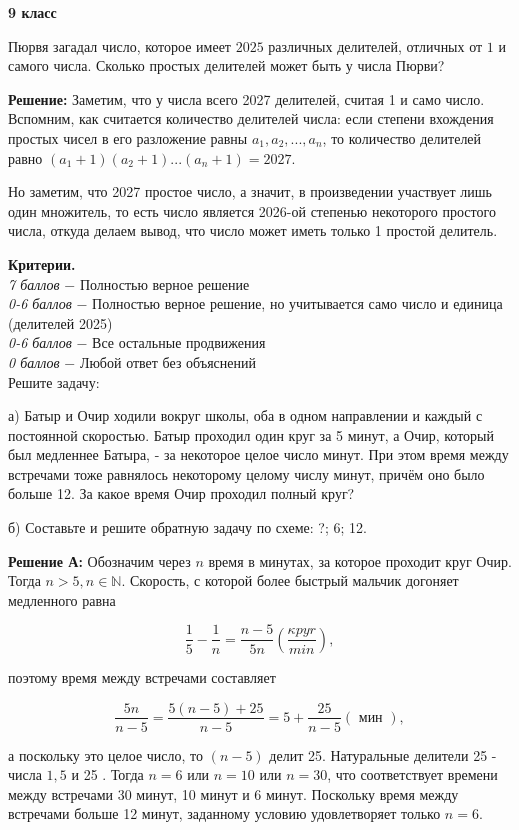 \centerline{\bf \Large  9 класс}

Пюрвя загадал число, которое имеет $2025$ различных делителей, отличных от $1$ и самого числа. Сколько простых делителей может быть у числа Пюрви?

\textbf{Решение:} Заметим, что у числа всего 2027 делителей, считая 1 и само число. Вспомним, как считается количество делителей числа:
если степени вхождения простых чисел в его разложение равны $a_1, a_2, ..., a_n$, то количество делителей равно
$(a_1+1)(a_2+1)...(a_n+1)=2027$.

Но заметим, что 2027 простое число, а значит, в произведении участвует лишь один множитель, то есть число является 2026-ой степенью некоторого простого числа, откуда делаем вывод, что число может иметь только 1 простой делитель.


\textbf{Критерии.} \\
\textit{7 баллов} $-$ Полностью верное решение\\
\textit{0-6 баллов} $-$ Полностью верное решение, но учитывается само число и единица (делителей 2025)\\
\textit{0-6 баллов} $-$ Все остальные продвижения\\
\textit{0 баллов} $-$ Любой ответ без объяснений\\


 Решите задачу:

а) Батыр и Очир ходили вокруг школы, оба в одном направлении и каждый с постоянной скоростью. Батыр проходил один круг за 5 минут, а Очир, который был медленнее Батыра, - за некоторое целое число минут. При этом время между встречами тоже равнялось некоторому целому числу минут, причём оно было больше 12. За какое время Очир проходил полный круг?

б) Составьте и решите обратную задачу по схеме: ?; 6; 12.

\textbf{Решение А:} Обозначим через $n$ время в минутах, за которое проходит круг Очир. Тогда $n>5, n \in \mathbb{N}$. Скорость, с которой более быстрый мальчик догоняет медленного равна

$$
\frac{1}{5}-\frac{1}{n}=\frac{n-5}{5 n}\left(\frac{\kappa p y r}{min}\right),
$$


поэтому время между встречами составляет

$$
\frac{5 n}{n-5}=\frac{5(n-5)+25}{n-5}=5+\frac{25}{n-5}(\text { мин }),
$$


а поскольку это целое число, то $(n-5)$ делит 25. Натуральные делители 25 - числа $1 , 5$ и 25 . Тогда $n=6$ или $n=10$ или $n=30$, что соответствует времени между встречами 30 минут, 10 минут и 6 минут. Поскольку время между встречами больше 12 минут, заданному условию удовлетворяет только $n=6$.


